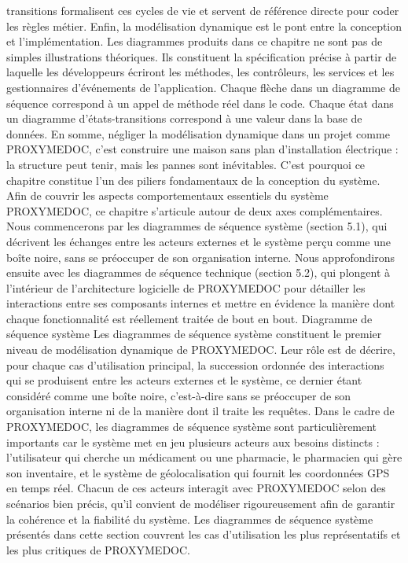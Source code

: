 \documentclass[12pt,a4paper]{report}
\begin{document}
transitions formalisent ces cycles de vie et servent de référence directe pour coder  les règles métier. 
Enfin, la modélisation dynamique est le pont entre la conception et  l'implémentation. Les diagrammes produits dans ce chapitre ne sont pas de  simples illustrations théoriques. Ils constituent la spécification précise à partir de  laquelle les développeurs écriront les méthodes, les contrôleurs, les services et les  gestionnaires d'événements de l'application. Chaque flèche dans un diagramme de  séquence correspond à un appel de méthode réel dans le code. Chaque état dans  un diagramme d'états-transitions correspond à une valeur dans la base de données. 
En somme, négliger la modélisation dynamique dans un projet comme  PROXYMEDOC, c'est construire une maison sans plan d'installation électrique : la  structure peut tenir, mais les pannes sont inévitables. C'est pourquoi ce chapitre  constitue l'un des piliers fondamentaux de la conception du système. 
Afin de couvrir les aspects comportementaux essentiels du système PROXYMEDOC, ce  chapitre s'articule autour de deux axes complémentaires. Nous commencerons par les  diagrammes de séquence système (section 5.1), qui décrivent les échanges entre les acteurs  externes et le système perçu comme une boîte noire, sans se préoccuper de son organisation  interne. Nous approfondirons ensuite avec les diagrammes de séquence technique (section  5.2), qui plongent à l'intérieur de l'architecture logicielle de PROXYMEDOC pour détailler les  interactions entre ses composants internes et mettre en évidence la manière dont chaque  fonctionnalité est réellement traitée de bout en bout. 
Diagramme de séquence système
Les diagrammes de séquence système constituent le premier niveau de modélisation  dynamique de PROXYMEDOC. Leur rôle est de décrire, pour chaque cas d'utilisation  principal, la succession ordonnée des interactions qui se produisent entre les acteurs  externes et le système, ce dernier étant considéré comme une boîte noire, c'est-à-dire sans  se préoccuper de son organisation interne ni de la manière dont il traite les requêtes. Dans le  cadre de PROXYMEDOC, les diagrammes de séquence système sont particulièrement  importants car le système met en jeu plusieurs acteurs aux besoins distincts : l'utilisateur qui  cherche un médicament ou une pharmacie, le pharmacien qui gère son inventaire, et le  système de géolocalisation qui fournit les coordonnées GPS en temps réel. Chacun de ces  acteurs interagit avec PROXYMEDOC selon des scénarios bien précis, qu'il convient de  modéliser rigoureusement afin de garantir la cohérence et la fiabilité du système. Les diagrammes de séquence système présentés dans cette section couvrent les cas d'utilisation les plus représentatifs et les plus  critiques de PROXYMEDOC.
 
\end{document}
